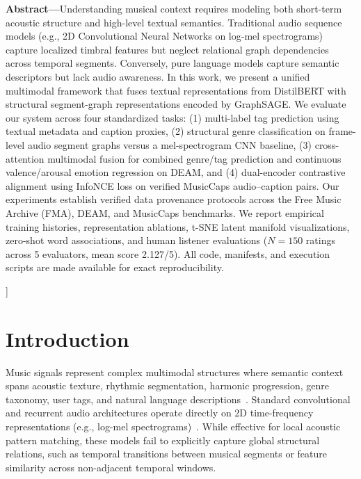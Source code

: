 \documentclass[10pt,twocolumn]{article}
\begin{document}
\vspace{1.0em}
\begin{minipage}{\textwidth}
\small
\textbf{Abstract---}Understanding musical context requires modeling both short-term acoustic structure and high-level textual semantics. Traditional audio sequence models (e.g., 2D Convolutional Neural Networks on log-mel spectrograms) capture localized timbral features but neglect relational graph dependencies across temporal segments. Conversely, pure language models capture semantic descriptors but lack audio awareness. In this work, we present a unified multimodal framework that fuses textual representations from DistilBERT with structural segment-graph representations encoded by GraphSAGE. We evaluate our system across four standardized tasks: (1) multi-label tag prediction using textual metadata and caption proxies, (2) structural genre classification on frame-level audio segment graphs versus a mel-spectrogram CNN baseline, (3) cross-attention multimodal fusion for combined genre/tag prediction and continuous valence/arousal emotion regression on DEAM, and (4) dual-encoder contrastive alignment using InfoNCE loss on verified MusicCaps audio--caption pairs. Our experiments establish verified data provenance protocols across the Free Music Archive (FMA), DEAM, and MusicCaps benchmarks. We report empirical training histories, representation ablations, t-SNE latent manifold visualizations, zero-shot word associations, and human listener evaluations ($N=150$ ratings across 5 evaluators, mean score 2.127/5). All code, manifests, and execution scripts are made available for exact reproducibility.
\end{minipage}
\vspace{1.4em}
]

\section{Introduction}
Music signals represent complex multimodal structures where semantic context spans acoustic texture, rhythmic segmentation, harmonic progression, genre taxonomy, user tags, and natural language descriptions~\cite{fma, musiccaps}. Standard convolutional and recurrent audio architectures operate directly on 2D time-frequency representations (e.g., log-mel spectrograms)~\cite{fma}. While effective for local acoustic pattern matching, these models fail to explicitly capture global structural relations, such as temporal transitions between musical segments or feature similarity across non-adjacent temporal windows.
\end{document}
